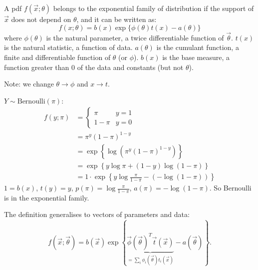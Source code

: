 \documentclass[10pt, a4paper]{article}
\begin{document}
\begin{definition}
    A pdf $f(\vec{x}; \theta)$ belongs to the exponential family of distribution if the support of $\vec{x}$ does not depend on $\theta$,
    and it can be written as:
    \[
    f(x; \theta) = b(x)\exp\{\phi(\theta)t(x) - a(\theta)\}
    \]
    where
    $\phi(\theta)$ is the natural parameter,
    a twice differentiable function of $\vec{\theta}$.
    $t(x)$ is the natural statistic,
    a function of data.
    $a(\theta)$ is the cumulant function,
    a finite and differentiable function of $\theta$
    (or $\phi$).
    $b(x)$ is the base measure,
    a function greater than $0$ of the data and constants
    (but not $\theta$).
\end{definition}
Note:
we change $\theta \to \phi$ and $x \to t$.

\begin{example}
    $Y \sim \mathrm{Bernoulli}(\pi)$:
    \begin{align*}
    f(y; \pi) &= \begin{cases}
        \pi & y = 1 \\
        1 - \pi & y = 0
    \end{cases} \\
    &= \pi ^ {y}(1 - \pi) ^ {1 - y} \\
    &= \exp\left\{\log(\pi ^ y(1 - \pi) ^ {1 - y})\right\} \\
    &= \exp\left\{y\log{\pi} + (1 - y)\log(1 - \pi)\right\} \\
    &= 1\cdot\exp\left\{y\log{\frac{\pi}{1 - \pi}} - (-\log(1 - \pi))\right\}
    \end{align*}
    $1 = b(x)$,
    $t(y) = y$,
    $p(\pi) = \log{\frac{\pi}{1 - \pi}}$,
    $a(\pi) = -\log(1 - \pi)$.
    So Bernoulli is in the exponential family.
\end{example}

The definition generalises to vectors of parameters and data:
\[
f(\vec{x}; \vec{\theta}) = b(\vec{x})\exp\left\{\underbrace{\vec{\phi}(\vec{\theta}) ^ T\vec{t}(\vec{x})}_{=\sum_{i}\phi_i(\vec{\theta})t_i(\vec{x})} - a(\vec{\theta})\right\}.
\]
\end{document}
